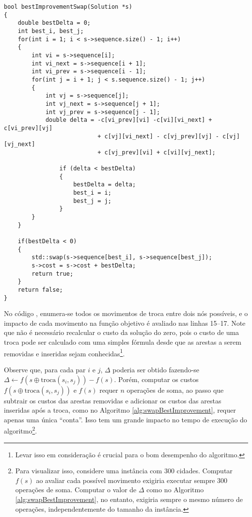 \begin{lstlisting}[style=cplusplusListStyle]
bool bestImprovementSwap(Solution *s)
{
	double bestDelta = 0;
	int best_i, best_j;
	for(int i = 1; i < s->sequence.size() - 1; i++)
	{
	    int vi = s->sequence[i];
	    int vi_next = s->sequence[i + 1];
	    int vi_prev = s->sequence[i - 1];
		for(int j = i + 1; j < s.sequence.size() - 1; j++)
		{
    	    int vj = s->sequence[j];
	        int vj_next = s->sequence[j + 1];
	        int vj_prev = s->sequence[j - 1];
	        double delta = -c[vi_prev][vi] -c[vi][vi_next] + c[vi_prev][vj] 
			               + c[vj][vi_next] - c[vj_prev][vj] - c[vj][vj_next] 
			               + c[vj_prev][vi] + c[vi][vj_next];
			               
				if (delta < bestDelta)
				{
					bestDelta = delta;
					best_i = i;
					best_j = j;
				}
		}
	}
            
	if(bestDelta < 0)
	{
		std::swap(s->sequence[best_i], s->sequence[best_j]);
		s->cost = s->cost + bestDelta;
		return true;
	}
	return false;
}
\end{lstlisting}

No código , enumera-se todos os movimentos de troca entre dois nós possíveis, e o impacto de cada movimento na função objetivo é avaliado nas linhas 15--17. Note que não é necessário recalcular o custo da solução do zero, pois o custo de uma troca pode ser calculado com uma simples fórmula desde que as arestas a serem removidas e inseridas sejam conhecidas\footnote{Levar isso em consideração é crucial para o bom desempenho do algoritmo.}.

\iffalse

Observe que, para cada par \(i\) e \(j\), \(\Delta\) poderia ser obtido fazendo-se \(\Delta \gets f(s\oplus \text{troca}(s_i,s_j)) - f(s)\). Porém, computar os custos \(f(s\oplus \text{troca}(s_i,s_j))\) e \(f(s)\) requer \(n\) operações de soma, ao passo que subtrair os custos das arestas removidas e adicionar os custos das arestas inseridas após a troca, como no Algoritmo \ref{alg:swapBestImprovement}, requer apenas uma única ``conta''. Isso tem um grande impacto no tempo de execução do algoritmo\footnote{Para visualizar isso, considere uma instância com 300 cidades. Computar \(f(s)\) ao avaliar cada possível movimento exigiria executar sempre 300 operações de soma. Computar o valor de \(\Delta\) como no Algoritmo \ref{alg:swapBestImprovement}, no entanto, exigiria sempre o mesmo número de operações, independentemente do tamanho da instância.}.


